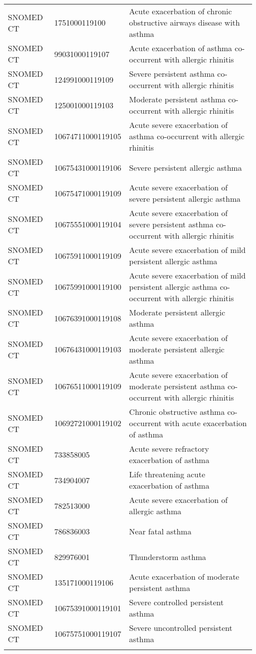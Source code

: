 \begin{longtable}{p{}p{}p{}}
  SNOMED CT & 1751000119100 & Acute exacerbation of chronic obstructive airways disease with asthma \\ 
  SNOMED CT & 99031000119107 & Acute exacerbation of asthma co-occurrent with allergic rhinitis \\ 
  SNOMED CT & 124991000119109 & Severe persistent asthma co-occurrent with allergic rhinitis \\ 
  SNOMED CT & 125001000119103 & Moderate persistent asthma co-occurrent with allergic rhinitis \\ 
  SNOMED CT & 10674711000119105 & Acute severe exacerbation of asthma co-occurrent with allergic rhinitis \\ 
  SNOMED CT & 10675431000119106 & Severe persistent allergic asthma \\ 
  SNOMED CT & 10675471000119109 & Acute severe exacerbation of severe persistent allergic asthma \\ 
  SNOMED CT & 10675551000119104 & Acute severe exacerbation of severe persistent asthma co-occurrent with allergic rhinitis \\ 
  SNOMED CT & 10675911000119109 & Acute severe exacerbation of mild persistent allergic asthma \\ 
  SNOMED CT & 10675991000119100 & Acute severe exacerbation of mild persistent allergic asthma co-occurrent with allergic rhinitis \\ 
  SNOMED CT & 10676391000119108 & Moderate persistent allergic asthma \\ 
  SNOMED CT & 10676431000119103 & Acute severe exacerbation of moderate persistent allergic asthma \\ 
  SNOMED CT & 10676511000119109 & Acute severe exacerbation of moderate persistent asthma co-occurrent with allergic rhinitis \\ 
  SNOMED CT & 10692721000119102 & Chronic obstructive asthma co-occurrent with acute exacerbation of asthma \\ 
  SNOMED CT & 733858005 & Acute severe refractory exacerbation of asthma \\ 
  SNOMED CT & 734904007 & Life threatening acute exacerbation of asthma \\ 
  SNOMED CT & 782513000 & Acute severe exacerbation of allergic asthma \\ 
  SNOMED CT & 786836003 & Near fatal asthma \\ 
  SNOMED CT & 829976001 & Thunderstorm asthma \\ 
  SNOMED CT & 135171000119106 & Acute exacerbation of moderate persistent asthma \\ 
  SNOMED CT & 10675391000119101 & Severe controlled persistent asthma \\ 
  SNOMED CT & 10675751000119107 & Severe uncontrolled persistent asthma \\ 
  \hline
\label{tab:codes_asthma}
\end{longtable}
